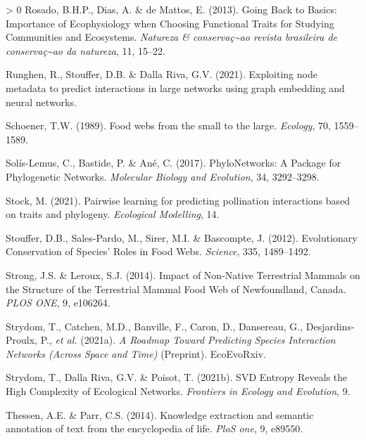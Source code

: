 \documentclass[10pt,oneside]{article}
\newlength{\cslhangindent}
\newenvironment{CSLReferences}[3] %
 {%
  \setlength{\parindent}{0pt}
  \ifodd #1 \everypar{\setlength{\hangindent}{\cslhangindent}}\ignorespaces\fi
  \ifnum #2 > 0
  \setlength{\parskip}{#2\baselineskip}
  \fi
 }%
 {}
\begin{document}
\begin{CSLReferences}{1}{0}
\leavevmode\hypertarget{ref-Rosado2013GoiBac}{}%
Rosado, B.H.P., Dias, A. \& de Mattos, E. (2013). Going Back to Basics:
Importance of Ecophysiology when Choosing Functional Traits for Studying
Communities and Ecosystems. \emph{Natureza \&
conservaç\textasciitilde ao revista brasileira de
conservaç\textasciitilde ao da natureza}, 11, 15--22.

\leavevmode\hypertarget{ref-Runghen2021ExpNod}{}%
Runghen, R., Stouffer, D.B. \& Dalla Riva, G.V. (2021). Exploiting node
metadata to predict interactions in large networks using graph embedding
and neural networks.

\leavevmode\hypertarget{ref-Schoener1989FooWeb}{}%
Schoener, T.W. (1989). Food webs from the small to the large.
\emph{Ecology}, 70, 1559--1589.

\leavevmode\hypertarget{ref-Solis-Lemus2017PhyPac}{}%
Solís-Lemus, C., Bastide, P. \& Ané, C. (2017). PhyloNetworks: A Package
for Phylogenetic Networks. \emph{Molecular Biology and Evolution}, 34,
3292--3298.

\leavevmode\hypertarget{ref-Stock2021PaiLea}{}%
Stock, M. (2021). Pairwise learning for predicting pollination
interactions based on traits and phylogeny. \emph{Ecological Modelling},
14.

\leavevmode\hypertarget{ref-Stouffer2012EvoCon}{}%
Stouffer, D.B., Sales-Pardo, M., Sirer, M.I. \& Bascompte, J. (2012).
Evolutionary Conservation of Species' Roles in Food Webs.
\emph{Science}, 335, 1489--1492.

\leavevmode\hypertarget{ref-Strong2014ImpNon}{}%
Strong, J.S. \& Leroux, S.J. (2014). Impact of Non-Native Terrestrial
Mammals on the Structure of the Terrestrial Mammal Food Web of
Newfoundland, Canada. \emph{PLOS ONE}, 9, e106264.

\leavevmode\hypertarget{ref-Strydom2021RoaPre}{}%
Strydom, T., Catchen, M.D., Banville, F., Caron, D., Dansereau, G.,
Desjardins-Proulx, P., \emph{et al.} (2021a). \emph{A Roadmap Toward
Predicting Species Interaction Networks (Across Space and Time)}
(Preprint). EcoEvoRxiv.

\leavevmode\hypertarget{ref-Strydom2021SvdEnt}{}%
Strydom, T., Dalla Riva, G.V. \& Poisot, T. (2021b). SVD Entropy Reveals
the High Complexity of Ecological Networks. \emph{Frontiers in Ecology
and Evolution}, 9.

\leavevmode\hypertarget{ref-Thessen2014KnoExt}{}%
Thessen, A.E. \& Parr, C.S. (2014). Knowledge extraction and semantic
annotation of text from the encyclopedia of life. \emph{PloS one}, 9,
e89550.


\end{CSLReferences}
\end{document}
